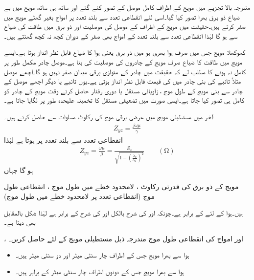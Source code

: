 مندرجہ بالا تجزیے میں مویج کے اطراف کامل موصل کے تصور کئے گئے اور ساتھ ہی ساتھ مویج میں بے ضیاع ذو برق بھرا تصور کیا گیا۔اسی لئے انقطاعی تعدد سے بلند تعدد پر امواج بغیر گھٹے مویج میں صفر کرتے ہیں۔حقیقت میں مویج کے اطراف کے موصل کی موصلیت اور ذو برق میں طاقت کی ضیاع سے   ہو گا لہٰذا انقطاعی تعدد سے بلند تعدد کے امواج بھی صفر کے دوران کچھ نہ کچھ گھٹتے ہیں۔

کھوکھلا مویج جس میں صرف ہوا بھری ہو میں ذو برق یعنی ہوا کا ضیاع  قابل نظر انداز ہوتا ہے۔ایسے مویج میں طاقت کا ضیاع صرف مویج کے چادروں کی موصلیت کی بنا ہے۔موصل چادر مکمل طور پر کامل نہ ہونے کا مطلب لے کہ حقیقت میں چادر کے متوازی برقی میدان  صفر نہیں ہو گا۔اچھے موصل مثلاً تانبے کی بنی چادر میں  کی قیمت قابل نظر انداز ہوتی ہے۔یوں تانبے یا دیگر اچھے موصل کے چادر سے بنی مویج کے طول موج ، زاویائی مستقل  یا دوری رفتار  حاصل کرتے وقت مویج کے چادر کو کامل ہی تصور کیا جاتا ہے۔ایسی صورت میں تضعیفی مستقل  کا تخمینہ  علیحدہ طور پر لگایا جاتا ہے۔

آخر میں مستطیلی مویج میں عرضی برقی موج کی رکاوٹ  مساوات  سے حاصل کرتے ہیں۔
\begin{align}
Z_{yz}=\frac{j\omega \mu}{\gamma}
\end{align} 
انقطاعی تعدد سے بلند تعدد پر  ہوتا ہے لہٰذا
\begin{align}\label{مساوات_مویج_عرضی_برقی_رکاوٹ_حتمی}
Z_{yz}=\frac{\omega \mu}{\beta}=\frac{Z_z}{\sqrt{1-\left(\frac{\lambda_0}{\lambda_{0c}}\right)^2}} \quad \quad (\si{\ohm})
\end{align} 
ہو گا جہاں
\begin{description}
 مویج کے ذو برق کی قدرتی رکاوٹ ،
 لامحدود خطے میں طول موج ،
 انقطاعی طول موج (انقطاعی تعدد پر لامحدود خطے میں طول موج)
\end{description}
ہیں۔ہوا کے لئے  کے برابر ہے۔چونکہ  اور  کی شرح  بالکل  اور  کی شرح کے برابر ہے لہٰذا شکل    بالمقابل  بھی دیتا ہے۔

،  اور   امواج کی انقطاعی طول موج مندرجہ ذیل مستطیلی مویج کے لئے حاصل کریں۔
\begin{itemize}
\item
ہوا سے بھرا مویج جس کے اطراف  چار سنٹی میٹر اور دو سنٹی میٹر ہیں۔
\item
ہوا سے بھرا مویج جس کے دونوں اطراف  چار سنٹی میٹر کے برابر ہیں۔
\end{itemize} 

